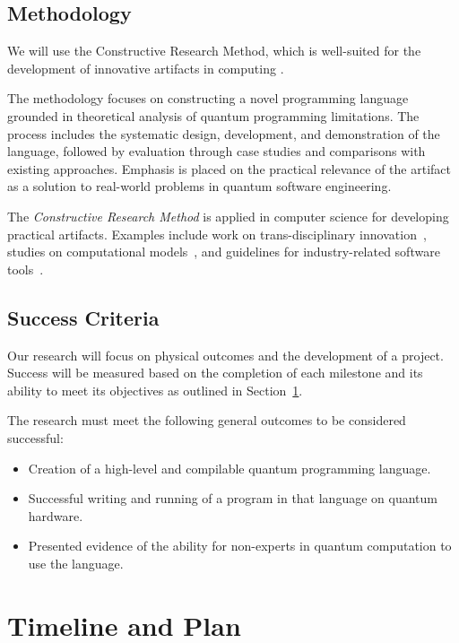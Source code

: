 \documentclass[journal,onecolumn, compsoc]{IEEEtran}
\begin{document}
\subsection{Methodology}
We will use the Constructive Research Method, which is well-suited for the development of innovative artifacts in computing \cite{lukka2003constructive}. 

The methodology focuses on constructing a novel programming language grounded in theoretical analysis of quantum programming limitations. 
The process includes the systematic design, development, and demonstration of the language, followed by evaluation through case studies and comparisons with existing approaches. 
Emphasis is placed on the practical relevance of the artifact as a solution to real-world problems in quantum software engineering.

The \textit{Constructive Research Method} is applied in computer science for developing practical artifacts. Examples include work on trans-disciplinary innovation~\cite{mcgregor2018}, studies on computational models~\cite{dodig2010}, and guidelines for industry-related software tools~\cite{lassenius2001}.

\subsection{Success Criteria}
Our research will focus on physical outcomes and the development of a project.
Success will be measured based on the completion of each milestone and its ability to meet its objectives as outlined in Section~\ref{sec:timeline-plan}.

The research must meet the following general outcomes to be considered successful:
\begin{itemize}
    \item Creation of a high-level and compilable quantum programming language.
    \item Successful writing and running of a program in that language on quantum hardware.
    \item Presented evidence of the ability for non-experts in quantum computation to use the language.
\end{itemize}

\section{Timeline and Plan}\label{sec:timeline-plan}
\end{document}
